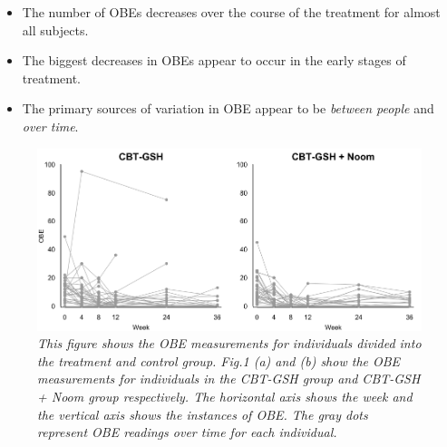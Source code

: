 \documentclass{article}
\begin{document}
\begin{itemize}
\item{The number of OBEs decreases over the course of the treatment for almost all subjects.}
\item{The biggest decreases in OBEs appear to occur in the early stages of treatment.}
\item{The primary sources of variation in OBE appear to be \emph{between people} and \emph{over time}.}
\end{itemize}
%
\begin{figure}[H]
   \begin{center}
\includegraphics[width=\textwidth, height=\textheight, keepaspectratio]{Noom_paths.png}
   \end{center}
\caption{\emph{This figure shows the OBE measurements for individuals divided into the treatment and control group. Fig.1 (a) and (b) show the OBE measurements for individuals in the CBT-GSH group and CBT-GSH + Noom group respectively. The horizontal axis shows the week and the vertical axis shows the instances of OBE. The gray dots represent OBE readings over time for each individual. }}
\end{figure}
%
\end{document}
